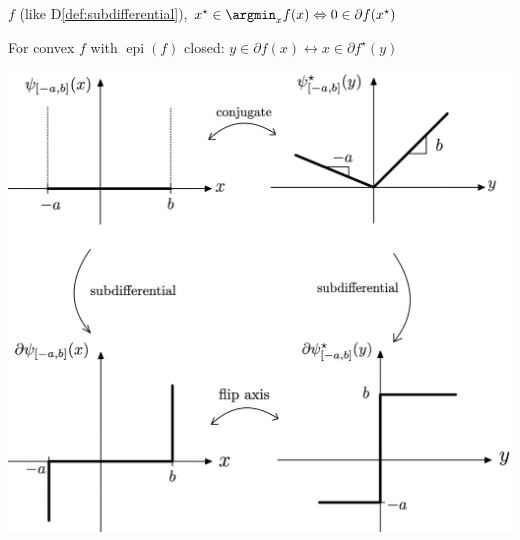 \begin{proposition}[]
	$f$ (like D\ref{def:subdifferential}),
	$x^\star\in\argmin_x f(x)
		\Leftrightarrow
		0 \in\partial f(x^\star)$
\end{proposition}

\begin{proposition}
	For convex $f$ with $\operatorname{epi}(f)$ closed:
	$y \in \partial f(x) \leftrightarrow x \in \partial f^\star(y)$
\end{proposition}

\begin{flushright}
	\includegraphics[width=0.92\columnwidth]{images/conjugate_subdiff.png}
\end{flushright}
